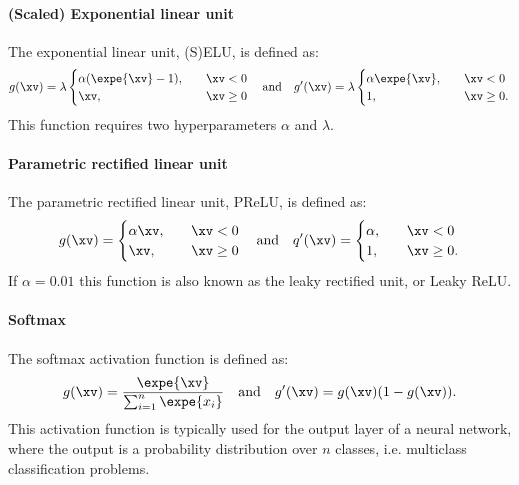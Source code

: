         \paragraph{(Scaled) Exponential linear unit}
            The exponential linear unit, (S)ELU, is defined as:
            \begin{equation}\label{eq:ML:NN:activation:selu}
                g(\xv) = \lambda
                \begin{cases}
                    \alpha(\expe{\xv}-1), \quad & \xv < 0 \\
                    \xv, \quad & \xv \geq 0
                \end{cases}
                \quad \mathrm{and} \quad
                g'(\xv) = \lambda
                \begin{cases}
                    \alpha\expe{\xv}, \quad & \xv < 0 \\
                    1, \quad & \xv \geq 0.
                \end{cases}
            \end{equation}
            This function requires two hyperparameters $\alpha$ and $\lambda$.

        \paragraph{Parametric rectified linear unit}
            The parametric rectified linear unit, PReLU, is defined as:
            \begin{equation}\label{eq:ML:NN:activation:prelu}
                g(\xv) = 
                \begin{cases}
                    \alpha \xv, \quad & \xv<0 \\
                    \xv, \quad & \xv\geq 0
                \end{cases}
                \quad \mathrm{and} \quad
                q'(\xv) = 
                \begin{cases}
                    \alpha, \quad & \xv<0 \\
                    1, \quad & \xv\geq 0.
                \end{cases}
            \end{equation}
            If $\alpha=0.01$ this function is also known as the leaky rectified unit, or Leaky ReLU. 

        \paragraph{Softmax}
            The softmax activation function is defined as:
            \begin{equation}\label{eq:ML:NN:activation:softmax}
                g(\xv) = \frac{\expe{\xv}}{\sum_{i=1}^n\expe{x_i}} \quad \mathrm{and} \quad g'(\xv) = g(\xv)(1-g(\xv)).
            \end{equation}
            This activation function is typically used for the output layer of a neural network, where the output is a probability distribution over $n$ classes, i.e. multiclass classification problems. 
    
